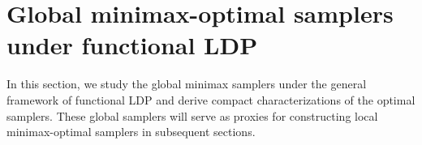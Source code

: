 \documentclass[accepted]{article}
\theoremstyle{plain} %
\theoremstyle{definition}
\theoremstyle{remark}
\newcommand{\HG}[1]{\textcolor{cyan}{[#1]}}
\begin{document}





\vspace{0.1cm}
\section{Global minimax-optimal samplers under functional LDP}\label{sec: global functional}
\vspace{0.1cm}


In this section, we study the global minimax samplers under the general framework of functional LDP and derive compact characterizations of the optimal samplers. These global samplers will serve as proxies for constructing local minimax-optimal samplers in subsequent sections.
\end{document}
